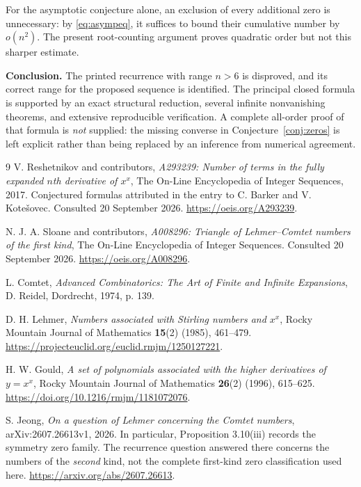 \documentclass[11pt,a4paper]{article}
\numberwithin{equation}{section}
\theoremstyle{definition}
\theoremstyle{remark}
\begin{document}
For the asymptotic conjecture alone, an exclusion of every additional zero
is unnecessary: by \eqref{eq:asympeq}, it suffices to bound their cumulative
number by $o(n^2)$. The present root-counting argument proves quadratic
order but not this sharper estimate.

\medskip
\noindent\textbf{Conclusion.}
The printed recurrence with range $n>6$ is disproved, and its correct
range for the proposed sequence is identified. The principal closed formula
is supported by an exact structural reduction, several infinite
nonvanishing theorems, and extensive reproducible verification. A complete
all-order proof of that formula is \emph{not} supplied: the missing converse
in Conjecture~\ref{conj:zeros} is left explicit rather than being replaced
by an inference from numerical agreement.

\clearpage
\begin{thebibliography}{9}
V. Reshetnikov and contributors,
\emph{A293239: Number of terms in the fully expanded $n$th derivative of $x^x$},
The On-Line Encyclopedia of Integer Sequences, 2017.
Conjectured formulas attributed in the entry to C. Barker and V. Kote\v{s}ovec.
Consulted 20 September 2026.
\url{https://oeis.org/A293239}.

N. J. A. Sloane and contributors,
\emph{A008296: Triangle of Lehmer--Comtet numbers of the first kind},
The On-Line Encyclopedia of Integer Sequences.
Consulted 20 September 2026.
\url{https://oeis.org/A008296}.

L. Comtet,
\emph{Advanced Combinatorics: The Art of Finite and Infinite Expansions},
D. Reidel, Dordrecht, 1974, p. 139.

D. H. Lehmer,
\emph{Numbers associated with Stirling numbers and $x^x$},
Rocky Mountain Journal of Mathematics \textbf{15}(2) (1985), 461--479.
\url{https://projecteuclid.org/euclid.rmjm/1250127221}.

H. W. Gould,
\emph{A set of polynomials associated with the higher derivatives of $y=x^x$},
Rocky Mountain Journal of Mathematics \textbf{26}(2) (1996), 615--625.
\url{https://doi.org/10.1216/rmjm/1181072076}.

S. Jeong,
\emph{On a question of Lehmer concerning the Comtet numbers},
arXiv:2607.26613v1, 2026.
In particular, Proposition 3.10(iii) records the symmetry zero family.
The recurrence question answered there concerns the numbers of the
\emph{second} kind, not the complete first-kind zero classification used here.
\url{https://arxiv.org/abs/2607.26613}.
\end{thebibliography}
\end{document}
